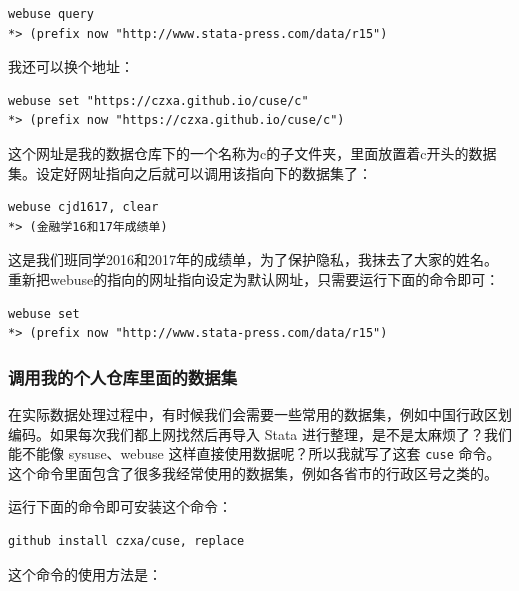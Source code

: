 \documentclass[]{ctexbook}
\begin{document}
\begin{lstlisting}
webuse query
*> (prefix now "http://www.stata-press.com/data/r15")
\end{lstlisting}

我还可以换个地址：

\begin{lstlisting}
webuse set "https://czxa.github.io/cuse/c"
*> (prefix now "https://czxa.github.io/cuse/c")
\end{lstlisting}

这个网址是我的数据仓库下的一个名称为c的子文件夹，里面放置着c开头的数据集。设定好网址指向之后就可以调用该指向下的数据集了：

\begin{lstlisting}
webuse cjd1617, clear
*> (金融学16和17年成绩单)
\end{lstlisting}

这是我们班同学2016和2017年的成绩单，为了保护隐私，我抹去了大家的姓名。
重新把webuse的指向的网址指向设定为默认网址，只需要运行下面的命令即可：

\begin{lstlisting}
webuse set
*> (prefix now "http://www.stata-press.com/data/r15")
\end{lstlisting}

\hypertarget{section-14}{%
\subsubsection{调用我的个人仓库里面的数据集}\label{section-14}}

在实际数据处理过程中，有时候我们会需要一些常用的数据集，例如中国行政区划编码。如果每次我们都上网找然后再导入 Stata 进行整理，是不是太麻烦了？我们能不能像 sysuse、webuse 这样直接使用数据呢？所以我就写了这套 \texttt{cuse} 命令。这个命令里面包含了很多我经常使用的数据集，例如各省市的行政区号之类的。

运行下面的命令即可安装这个命令：

\begin{lstlisting}
github install czxa/cuse, replace
\end{lstlisting}

这个命令的使用方法是：
\end{document}
